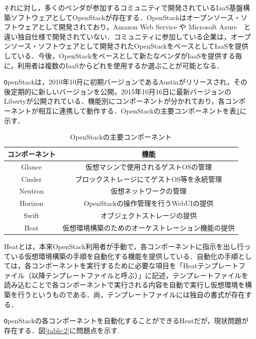\documentclass[mingoth]{kut-paper}		%
\begin{document}
	\texttt それに対し，多くのベンダが参加するコミュニティで開発されているIaaS基盤構築ソフトウェアとしてOpenStackが存在する．\cite{bib:3}OpenStackはオープンソース・ソフトウェアとして開発されており，Amazon Web Service や Microsoft Azure　と違い独自仕様で開発されていない．コミュニティに参加している企業は，オープンソース・ソフトウェアとして開発されたOpenStackをベースとしてIaaSを提供している．今後，OpenStackをベースとして新たなベンダがIaaSを提供する毎に，利用者は複数のIaaSからどれを使用するか選ぶことが可能となる．
	
	\texttt OpenStackは，2010年10月に初期バージョンであるAustinがリリースされ，その後定期的に新しいバージョンを公開，2015年10月16日に最新バージョンのLibertyが公開されている．機能別にコンポーネントが分かれており，各コンポーネントが相互に連携して動作する．OpenStackの主要コンポーネントを表\ref{table:1}に示す．
	\begin{table}[H]
		\begin{center}
			\caption{OpenStackの主要コンポーネント}
			\label{table:1}
			\begin{tabular}{|c|c|}\hline
				コンポーネント & 機能\\ \hline \hline
	     		Glance & 仮想マシンで使用されるゲストOSの管理\\ \hline
				Cinder & ブロックストレージにてゲストOS等を永続管理\\ \hline
				Neutron & 仮想ネットワークの管理\\ \hline
				Horizon & OpenStackの操作管理を行うWebUIの提供\\ \hline
				Swift & オブジェクトストレージの提供\\ \hline
				Heat & 仮想環境構築のためのオーケストレーション機能の提供\\ \hline
			\end{tabular}
		\end{center}
	\end{table}
	Heatとは，本来OpenStack利用者が手動で，各コンポーネントに指示を出し行っている仮想環境構築の手順を自動化する機能を提供している．自動化の手順としては，各コンポーネントを実行するために必要な項目を「Heatテンプレートファイル（以降テンプレートファイルと呼ぶ）」に記述，テンプレートファイルを読み込むことで各コンポーネントで実行される内容を自動で実行し仮想環境を構築を行うというものである．尚，テンプレートファイルには独自の書式が存在する．
	
	\texttt OpenStackの各コンポーネントを自動化することができるHeatだが，現状問題が存在する．図\ref{table:2}に問題点を示す.
	
\end{document}
